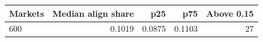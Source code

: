 \begin{tabular}{lrrrr}
\toprule
Markets & Median align share & p25 & p75 & Above 0.15 \\
\midrule
600 & 0.1019 & 0.0875 & 0.1103 & 27 \\
\bottomrule
\end{tabular}
